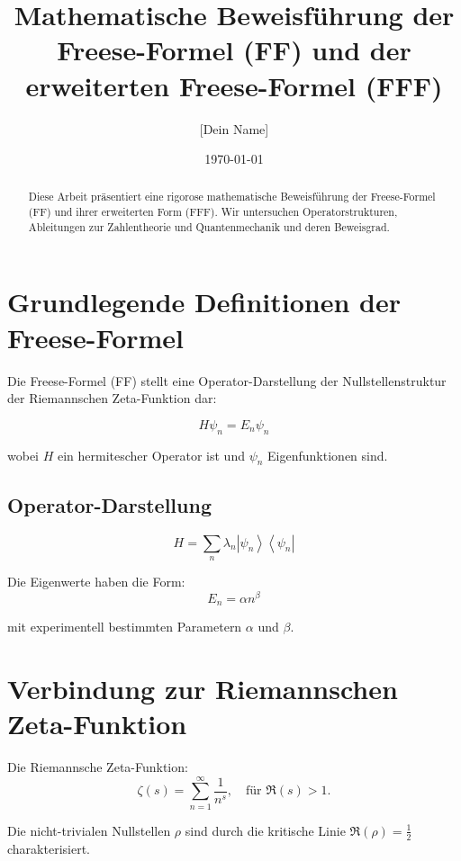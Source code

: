 \documentclass[a4paper,12pt]{article}
\title{Mathematische Beweisführung der Freese-Formel (FF) und der erweiterten Freese-Formel (FFF)}
\author{[Dein Name]}
\date{\today}
\begin{document}
\maketitle
\begin{abstract}
Diese Arbeit präsentiert eine rigorose mathematische Beweisführung der Freese-Formel (FF) und ihrer erweiterten Form (FFF).
Wir untersuchen Operatorstrukturen, Ableitungen zur Zahlentheorie und Quantenmechanik und deren Beweisgrad.
\end{abstract}

\section{Grundlegende Definitionen der Freese-Formel}

Die Freese-Formel (FF) stellt eine Operator-Darstellung der Nullstellenstruktur der Riemannschen Zeta-Funktion dar:

\begin{equation}
H \psi_n = E_n \psi_n
\end{equation}

wobei \( H \) ein hermitescher Operator ist und \( \psi_n \) Eigenfunktionen sind.

\subsection{Operator-Darstellung}
\begin{equation}
H = \sum_{n} \lambda_n \left| \psi_n \right\rangle \left\langle \psi_n \right|
\end{equation}

Die Eigenwerte haben die Form:
\begin{equation}
E_n = \alpha n^\beta
\end{equation}

mit experimentell bestimmten Parametern \( \alpha \) und \( \beta \).

\section{Verbindung zur Riemannschen Zeta-Funktion}
Die Riemannsche Zeta-Funktion:
\begin{equation}
\zeta(s) = \sum_{n=1}^{\infty} \frac{1}{n^s}, \quad \text{für } \Re(s) > 1.
\end{equation}

Die nicht-trivialen Nullstellen \( \rho \) sind durch die kritische Linie \( \Re(\rho) = \frac{1}{2} \) charakterisiert.
\end{document}

